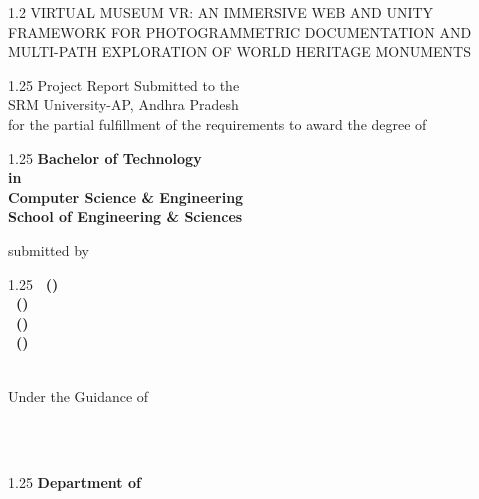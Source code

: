 \thispagestyle{empty}
\quad
\begin{center}

{\fontsize{15.5}{22}\selectfont \bfseries
 \begin{spacing}{1.2}
 \MakeUppercase{Virtual Museum VR: An Immersive Web and Unity Framework for Photogrammetric Documentation and Multi-Path Exploration of World Heritage Monuments}
 \end{spacing}}

\vspace{0.5cm}
\begin{spacing}{1.25}
Project Report Submitted to the \\
SRM University-AP, Andhra Pradesh\\
for the partial fulfillment of the requirements to award the degree of\\[0.5cm]
\end{spacing}
\begin{spacing}{1.25}
\textbf{Bachelor of Technology\\
in\\
Computer Science \& Engineering\\
School of Engineering \& Sciences}\\[0.3cm]
\end{spacing}
submitted by\\
\begin{spacing}{1.25}
{\fontsize{13}{20}\selectfont \bfseries
\vnameone~(\vregisternumberone)\\
\vnametwo~(\vregisternumbertwo)\\
\vnamethree~(\vregisternumberthree)\\
\vnamefour~(\vregisternumberfour)\\
}
\end{spacing}
\quad\\
Under the Guidance of\\
\vspace{0.4cm}
{\vguide}

\quad\\[0.2cm]
\quad\\[0.2cm]
\begin{spacing}{1.25}
{\fontsize{14}{20}\selectfont\bfseries Department of \vdept}\\
\vcollege\\
\vaddresslinei\\
\vaddresslineii\\
{\fontsize{14}{20}\selectfont \MakeUppercase{\vdate}}\\
\end{spacing}

\end{center}
\newpage
